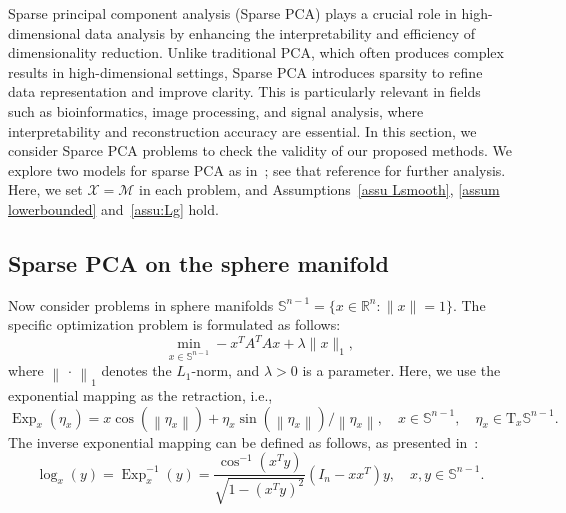 \documentclass[pdflatex,sn-mathphys-num]{sn-jnl}%
\theoremstyle{definition} %
\theoremstyle{remark} %
\newcommand{\norm}[1]{\left\|#1\right\|}
\begin{document}
Sparse principal component analysis (Sparse PCA) plays a crucial role in high-dimensional data analysis by enhancing the interpretability and efficiency of dimensionality reduction. Unlike traditional PCA, which often produces complex results in high-dimensional settings, Sparse PCA introduces sparsity to refine data representation and improve clarity. This is particularly relevant in fields such as bioinformatics, image processing, and signal analysis, where interpretability and reconstruction accuracy are essential. In this section, we consider Sparce PCA problems to check the validity of our proposed methods. 
We explore two models for sparse PCA as in~\cite{huang_riemannian_2022}; see that reference for further analysis. Here, we set $\mathcal{X} = \mathcal{M}$ in each problem, and Assumptions~\ref{assu Lsmooth}, \ref{assum lowerbounded} and~\ref{assu:Lg} hold.


\subsection{Sparse PCA on the sphere manifold}
Now consider problems in sphere manifolds $\mathbb{S}^{n-1}=\{x \in \mathbb{R}^n:\|x\|=1\}.$ 
The specific optimization problem is formulated as follows:
\begin{equation}\label{exam: sphere}
    \min _{x \in \mathbb{S}^{n-1}}  - x^T A^T A x + \lambda \|x\|_1, 
\end{equation}
where $\norm{\,\cdot\,}_1$ denotes the $L_1$-norm, and $\lambda > 0$ is a parameter.
Here, we use the exponential mapping as the retraction, i.e.,
$$
\operatorname{Exp}_x\left(\eta_x\right)=x \cos \left(\left\|\eta_x\right\|\right)+\eta_x \sin \left(\left\|\eta_x\right\|\right) /\left\|\eta_x\right\|, \quad x \in \mathbb{S}^{n-1}, \quad \eta_x \in \mathrm{T}_x \mathbb{S}^{n-1}.
$$
The inverse exponential mapping can be defined as follows, as presented in~\cite{huang_riemannian_2022}:
$$
\log _x(y)=\operatorname{Exp}_x^{-1}(y)=\frac{\cos ^{-1}\left(x^T y\right)}{\sqrt{1-\left(x^T y\right)^2}}\left(I_n-x x^T\right) y, \quad x, y \in \mathbb{S}^{n-1}.
$$
\end{document}
